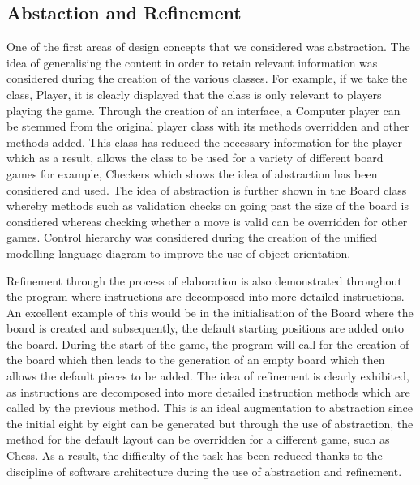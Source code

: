 \documentclass[a4wide, 11pt]{article}
\begin{document}
\subsection{Abstaction and Refinement}
One of the first areas of design concepts that we considered was abstraction. The idea of generalising the content in order to retain relevant information was considered during the creation of the various classes. For example, if we take the class, Player, it is clearly displayed that the class is only relevant to players playing the game. Through the creation of an interface, a Computer player can be stemmed from the original player class with its methods overridden and other methods added. This class has reduced the necessary information for the player which as a result, allows the class to be used for a variety of different board games for example, Checkers which shows the idea of abstraction has been considered and used.  The idea of abstraction is further shown in the Board class whereby methods such as validation checks on going past the size of the board is considered whereas checking whether a move is valid can be overridden for other games. Control hierarchy was considered during the creation of the unified modelling language diagram to improve the use of object orientation.

Refinement through the process of elaboration is also demonstrated throughout the program where instructions are decomposed into more detailed instructions. An excellent example of this would be in the initialisation of the Board where the board is created and subsequently, the default starting positions are added onto the board. During the start of the game, the program will call for the creation of the board which then leads to the generation of an empty board which then allows the default pieces to be added. The idea of refinement is clearly exhibited, as instructions are decomposed into more detailed instruction methods which are called by the previous method. This is an ideal augmentation to abstraction since the initial eight by eight can be generated but through the use of abstraction, the method for the default layout can be overridden for a different game, such as Chess. As a result, the difficulty of the task has been reduced thanks to the discipline of software architecture during the use of abstraction and refinement.
\end{document}
